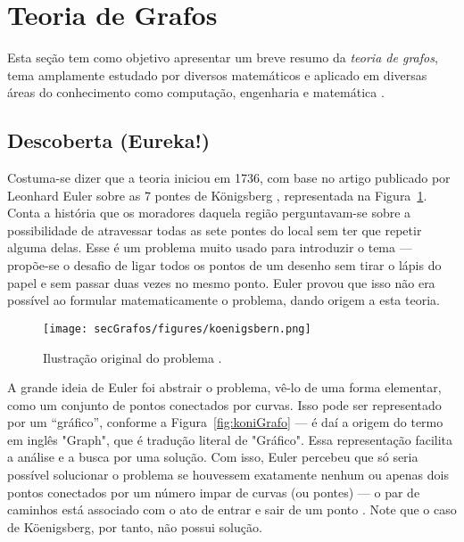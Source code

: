 \section{Teoria de Grafos\label{sec:grafos}}
Esta seção tem como objetivo apresentar um breve resumo da \textit{teoria de grafos}, tema amplamente estudado por diversos matemáticos e aplicado em diversas áreas do conhecimento como computação, engenharia e matemática \cite{graphTheoryApplicationsBondy}.

\subsection{Descoberta (Eureka!)}
Costuma-se dizer que a teoria iniciou em 1736, com base no artigo publicado por Leonhard Euler sobre as 7 pontes de Königsberg \cite{euler:KOENIGSBERG} \cite{graphTheoryApplicationsBondy}, representada na Figura~\ref{fig:koni}. Conta a história que os moradores daquela região perguntavam-se sobre a possibilidade de atravessar todas as sete pontes do local sem ter que repetir alguma delas. Esse é um problema muito usado para introduzir o tema \cite{problemsInMath} --- propõe-se o desafio de ligar todos os pontos de um desenho sem tirar o lápis do papel e sem passar duas vezes no mesmo ponto. Euler provou que isso não era possível ao formular matematicamente o problema, dando origem a esta teoria.

\begin{figure}[H]
	\begin{center}
		\texttt{[image: secGrafos/figures/koenigsbern.png]}
	\end{center}
	\caption{Ilustração original do problema \cite{euler:KOENIGSBERG}.}
	\label{fig:koni}
\end{figure}

A grande ideia de Euler foi abstrair o problema, vê-lo de uma forma elementar, como um conjunto de pontos conectados por curvas. Isso pode ser representado por um ``gráfico'', conforme a Figura~\ref{fig:koniGrafo} --- é daí a origem do termo em inglês "Graph", que é tradução literal de "Gráfico". Essa representação facilita a análise e a busca por uma solução. Com isso, Euler percebeu que só seria possível solucionar o problema se houvessem exatamente nenhum ou apenas dois pontos conectados por um número impar de curvas (ou pontes) --- o par de caminhos está associado com o ato de entrar e sair de um ponto \cite{euler:KOENIGSBERG}. Note que o caso de Köenigsberg, por tanto, não possui solução.

